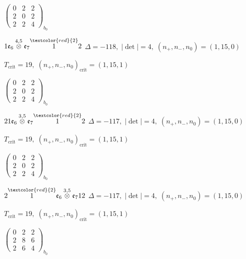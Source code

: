 \documentclass[10pt]{article}
\begin{document}
\hspace{2em}$\left(\begin{smallmatrix}0 & 2 & 2 \\ 2 & 0 & 2 \\ 2 & 2 & 4\end{smallmatrix}\right)_{\!b_0}$

\smallskip

$1\mathfrak{e}_6\overset{4,5}{\otimes}\mathfrak{e}_7\overset{\textcolor{red}{2}}{1}2$ \quad $\Delta=-118,\; |\det|=4,\; (n_+,n_-,n_0)=(1,15,0)$

\hspace{1em}$T_{\text{crit}}=19,\; (n_+,n_-,n_0)_{\text{crit}}=(1,15,1)$

\hspace{2em}$\left(\begin{smallmatrix}0 & 2 & 2 \\ 2 & 0 & 2 \\ 2 & 2 & 4\end{smallmatrix}\right)_{\!b_0}$

\smallskip

$21\mathfrak{e}_6\overset{3,5}{\otimes}\mathfrak{e}_7\overset{\textcolor{red}{2}}{1}2$ \quad $\Delta=-117,\; |\det|=4,\; (n_+,n_-,n_0)=(1,15,0)$

\hspace{1em}$T_{\text{crit}}=19,\; (n_+,n_-,n_0)_{\text{crit}}=(1,15,1)$

\hspace{2em}$\left(\begin{smallmatrix}0 & 2 & 2 \\ 2 & 0 & 2 \\ 2 & 2 & 4\end{smallmatrix}\right)_{\!b_0}$

$2\overset{\textcolor{red}{2}}{1}\mathfrak{e}_6\overset{3,5}{\otimes}\mathfrak{e}_712$ \quad $\Delta=-117,\; |\det|=4,\; (n_+,n_-,n_0)=(1,15,0)$

\hspace{1em}$T_{\text{crit}}=19,\; (n_+,n_-,n_0)_{\text{crit}}=(1,15,1)$

\hspace{2em}$\left(\begin{smallmatrix}0 & 2 & 2 \\ 2 & 8 & 6 \\ 2 & 6 & 4\end{smallmatrix}\right)_{\!b_0}$
\end{document}
